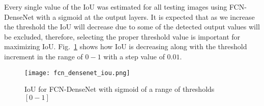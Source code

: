 	Every single value of the IoU was estimated for all testing images using FCN-DenseNet with a sigmoid at the output layers.
	It is expected that as we increase the threshold the IoU will decrease due to some of the detected output values will be excluded, therefore, selecting the proper threshold value is important for maximizing IoU. Fig.~\ref{fig:iou_fcn} shows how IoU is decreasing along with the threshold increment in the range of \(0-1\) with a step value of \(0.01\).
	\begin{figure}
		\centering
		\texttt{[image: fcn\_densenet\_iou.png]}
		\centering
		\caption{IoU for FCN-DenseNet with sigmoid of a range of thresholds \([0-1]\)} 
		\label{fig:iou_fcn}
	\end{figure}

	

